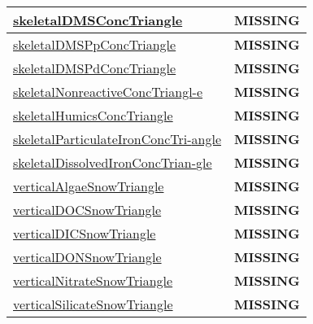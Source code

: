 {\begin{center}
\begin{longtable}{| p{2.0in} | p{4.0in} |}
    \hline
    \hyperref[subsec:var_sec_tracer_triangles_skeletalDMSConcTriangle]{skeletalDMSConcTriangle} & {\bf \color{red} MISSING} \\
    \hline
    \hyperref[subsec:var_sec_tracer_triangles_skeletalDMSPpConcTriangle]{skeletalDMSPpConcTriangle} & {\bf \color{red} MISSING} \\
    \hline
    \hyperref[subsec:var_sec_tracer_triangles_skeletalDMSPdConcTriangle]{skeletalDMSPdConcTriangle} & {\bf \color{red} MISSING} \\
    \hline
    \hyperref[subsec:var_sec_tracer_triangles_skeletalNonreactiveConcTriangle]{skeletalNonreactiveConcTriangl-}\hyperref[subsec:var_sec_tracer_triangles_skeletalNonreactiveConcTriangle]{e  }& {\bf \color{red} MISSING} \\
    \hline
    \hyperref[subsec:var_sec_tracer_triangles_skeletalHumicsConcTriangle]{skeletalHumicsConcTriangle} & {\bf \color{red} MISSING} \\
    \hline
    \hyperref[subsec:var_sec_tracer_triangles_skeletalParticulateIronConcTriangle]{skeletalParticulateIronConcTri-}\hyperref[subsec:var_sec_tracer_triangles_skeletalParticulateIronConcTriangle]{angle  }& {\bf \color{red} MISSING} \\
    \hline
    \hyperref[subsec:var_sec_tracer_triangles_skeletalDissolvedIronConcTriangle]{skeletalDissolvedIronConcTrian-}\hyperref[subsec:var_sec_tracer_triangles_skeletalDissolvedIronConcTriangle]{gle  }& {\bf \color{red} MISSING} \\
    \hline
    \hyperref[subsec:var_sec_tracer_triangles_verticalAlgaeSnowTriangle]{verticalAlgaeSnowTriangle} & {\bf \color{red} MISSING} \\
    \hline
    \hyperref[subsec:var_sec_tracer_triangles_verticalDOCSnowTriangle]{verticalDOCSnowTriangle} & {\bf \color{red} MISSING} \\
    \hline
    \hyperref[subsec:var_sec_tracer_triangles_verticalDICSnowTriangle]{verticalDICSnowTriangle} & {\bf \color{red} MISSING} \\
    \hline
    \hyperref[subsec:var_sec_tracer_triangles_verticalDONSnowTriangle]{verticalDONSnowTriangle} & {\bf \color{red} MISSING} \\
    \hline
    \hyperref[subsec:var_sec_tracer_triangles_verticalNitrateSnowTriangle]{verticalNitrateSnowTriangle} & {\bf \color{red} MISSING} \\
    \hline
    \hyperref[subsec:var_sec_tracer_triangles_verticalSilicateSnowTriangle]{verticalSilicateSnowTriangle} & {\bf \color{red} MISSING} \\

\end{longtable}
\end{center}}
